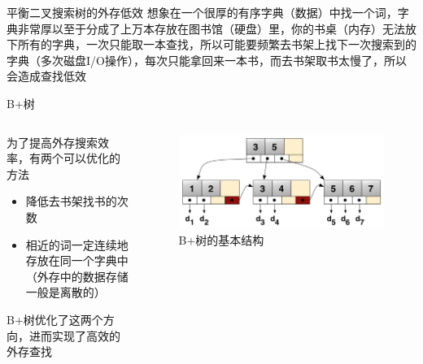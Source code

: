 \documentclass[aspectratio=169]{beamer}
\begin{document}
\begin{frame}{平衡二叉搜索树的外存低效}
    想象在一个很厚的有序字典（数据）中找一个词，字典非常厚以至于分成了上万本存放在图书馆（硬盘）里，你的书桌（内存）无法放下所有的字典，一次只能取一本查找，所以可能要频繁去书架上找下一次搜索到的字典（多次磁盘I/O操作），每次只能拿回来一本书，而去书架取书太慢了，所以会造成查找低效
\end{frame}

\begin{frame}{B+树}
    \begin{columns}
        \begin{column}{0.6\textwidth}
            为了提高外存搜索效率，有两个可以优化的方法
            \begin{itemize}
                \item 降低去书架找书的次数
                \item 相近的词一定连续地存放在同一个字典中（外存中的数据存储一般是离散的）
            \end{itemize}
            B+树优化了这两个方向，进而实现了高效的外存查找
        \end{column}
        \begin{column}{0.4\textwidth}
            \begin{figure}[t]
                \begin{center}
                \centerline{\includegraphics[width=0.9\columnwidth]{resources/Bplustree.png}}
                \caption{B+树的基本结构}
                \label{fig: bplustree}
                \end{center}
            \end{figure}
        \end{column}
    \end{columns}
\end{frame}
\end{document}
